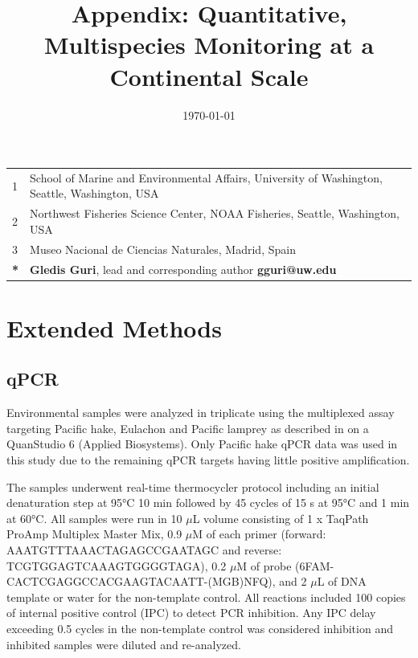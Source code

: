 \documentclass{article}
\title{Appendix: Quantitative, Multispecies Monitoring at a Continental Scale}
\author{Gledis Guri$^1$\textbf{*} \and
Owen Liu$^2$ \and
Ryan P. Kelly$^1$ \and
Megan R. Shaffer$^1$\and
Kim Parsons$^2$ \and
Ana Ram\'on-Laca$^{1,2,3}$ \and
Krista M. Nichols$^2$ \and
Pedro F. P. Brandão-Dias$^1$ \and
Abigail Wells$^2$ \and
Andrew Olaf Shelton$^2$ \and}
\date{\today}
\begin{document}
\maketitle

\section*{}

\begin{center}
\begin{tabular}{ll}
1 & School of Marine and Environmental Affairs, University of Washington, Seattle, Washington, USA \\
2 & Northwest Fisheries Science Center, NOAA Fisheries, Seattle, Washington, USA \\
3 & Museo Nacional de Ciencias Naturales, Madrid, Spain \\
\hline
\textbf{*} & \textbf{Gledis Guri}, lead and corresponding author \textbf{gguri@uw.edu}
\end{tabular}
\end{center}

\section*{Extended Methods}
\subsection*{qPCR}
Environmental samples were analyzed in triplicate using the multiplexed assay targeting Pacific hake, Eulachon and Pacific lamprey as described in \cite{ramon-laca2021} on a QuanStudio 6 (Applied Biosystems). Only Pacific hake qPCR data was used in this study due to the remaining qPCR targets having little positive amplification. 

The samples underwent real-time thermocycler protocol including an initial denaturation step at 95°C 10 min followed by 45 cycles of 15 s at 95°C and 1 min at 60°C. All samples were run in 10 $\mu$L volume consisting of 1 x TaqPath ProAmp Multiplex Master Mix, 0.9 $\mu$M of each primer (forward: AAATGTTTAAACTAGAGCCGAATAGC and reverse: TCGTGGAGTCAAAGTGGGGTAGA), 0.2 $\mu$M of probe (6FAM-CACTCGAGGCCACGAAGTACAATT-(MGB)NFQ), and 2 $\mu$L of DNA template or water for the non-template control. All reactions included 100 copies of internal positive control (IPC) to detect PCR inhibition. Any IPC delay exceeding 0.5 cycles in the non-template control was considered inhibition and inhibited samples were diluted and re-analyzed. 
\end{document}
